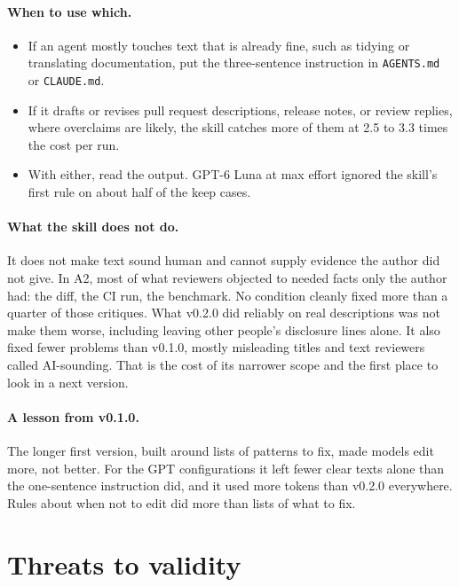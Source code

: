 \documentclass[11pt]{article}
\newcommand{\code}[1]{\texttt{#1}}
\begin{document}
\paragraph{When to use which.}
\begin{itemize}
  \item If an agent mostly touches text that is already fine, such as tidying or
    translating documentation, put the three-sentence instruction in \code{AGENTS.md} or
    \code{CLAUDE.md}.
  \item If it drafts or revises pull request descriptions, release notes, or review
    replies, where overclaims are likely, the skill catches more of them at 2.5 to 3.3
    times the cost per run.
  \item With either, read the output. GPT-6 Luna at max effort ignored the skill's first
    rule on about half of the keep cases.
\end{itemize}

\paragraph{What the skill does not do.} It does not make text sound human and cannot
supply evidence the author did not give. In A2, most of what reviewers objected to needed facts only
the author had: the diff, the CI run, the benchmark. No condition cleanly fixed more than a
quarter of those critiques. What v0.2.0 did reliably on real descriptions was not make them
worse, including leaving other people's disclosure lines alone. It also fixed fewer
problems than v0.1.0, mostly misleading titles and text reviewers called AI-sounding.
That is the cost of its narrower scope and the first place to look in a next version.

\paragraph{A lesson from v0.1.0.} The longer first version, built around lists of patterns
to fix, made models edit more, not better. For the GPT configurations it left fewer clear
texts alone than the one-sentence instruction did, and it used more tokens than v0.2.0
everywhere. Rules about when not to edit did more than lists of what to fix.

\section{Threats to validity}
\label{sec:threats}
\end{document}
